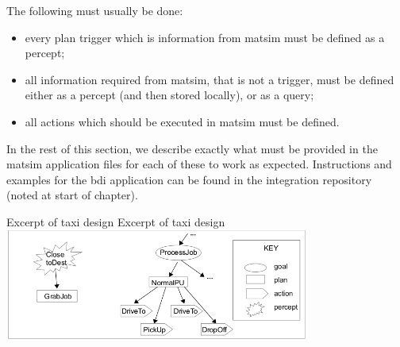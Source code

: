 The following must usually be done:
\begin{itemize}\styleItemize
\item every plan trigger which is information from \gls{matsim} must
be defined as a percept; 
\item all information required from
\gls{matsim}, that is not a trigger, must be defined either as a
percept (and then stored locally), or as a query; 
\item all actions which should be executed in \gls{matsim} must be defined.
\end{itemize}
%
In the rest of this section, we describe exactly what must be provided
in the \gls{matsim} application files for each of these to work as
expected. Instructions and examples for the \gls{bdi} application can be
found in the integration repository (noted at start of chapter).


\createfigure%
{Excerpt of taxi design}%
{Excerpt of taxi design}%
{\label{taxigptree}}%
{\includegraphics[width=0.75\textwidth]{extending/figures/bdi/fig-taxi-gptree.jpg}}%
{}

